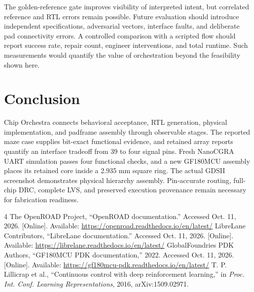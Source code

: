 ﻿\documentclass[conference,letterpaper]{IEEEtran}
\begin{document}
The golden-reference gate improves visibility of interpreted intent, but correlated reference and RTL errors remain possible. Future evaluation should introduce independent specifications, adversarial vectors, interface faults, and deliberate pad connectivity errors. A controlled comparison with a scripted flow should report success rate, repair count, engineer interventions, and total runtime. Such measurements would quantify the value of orchestration beyond the feasibility shown here.

\section{Conclusion}
Chip Orchestra connects behavioral acceptance, RTL generation, physical implementation, and padframe assembly through observable stages. The reported maze case supplies bit-exact functional evidence, and retained array reports quantify an interface tradeoff from 39 to four signal pins. Fresh NanoCGRA UART simulation passes four functional checks, and a new GF180MCU assembly places its retained core inside a 2.935 mm square ring. The actual GDSII screenshot demonstrates physical hierarchy assembly. Pin-accurate routing, full-chip DRC, complete LVS, and preserved execution provenance remain necessary for fabrication readiness.

\begin{thebibliography}{4}
 The OpenROAD Project, ``OpenROAD documentation.'' Accessed Oct. 11, 2026. [Online]. Available: \url{https://openroad.readthedocs.io/en/latest/}
 LibreLane Contributors, ``LibreLane documentation.'' Accessed Oct. 11, 2026. [Online]. Available: \url{https://librelane.readthedocs.io/en/latest/}
 GlobalFoundries PDK Authors, ``GF180MCU PDK documentation,'' 2022. Accessed Oct. 11, 2026. [Online]. Available: \url{https://gf180mcu-pdk.readthedocs.io/en/latest/}
 T. P. Lillicrap et al., ``Continuous control with deep reinforcement learning,'' in \emph{Proc. Int. Conf. Learning Representations}, 2016, arXiv:1509.02971.
\end{thebibliography}
\end{document}
